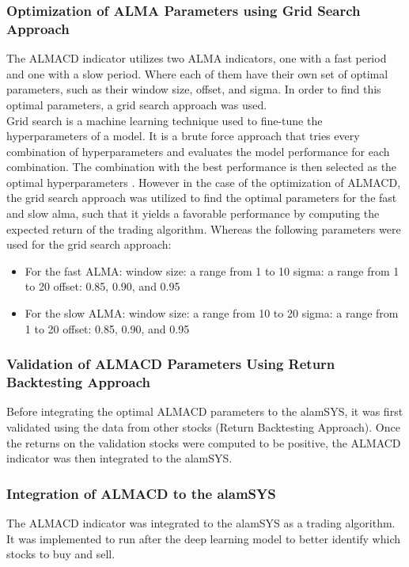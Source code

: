 \subsubsection{Optimization of ALMA Parameters using Grid Search Approach}
\label{subsubsec:almacd_gridsearch}
The ALMACD indicator utilizes two ALMA indicators, one with a fast
period and one with a slow period. Where each of them have their own
set of optimal parameters, such as their window size, offset, and sigma.
In order to find this optimal parameters, a grid search approach was
used.
\hfill \\
Grid search is a machine learning technique used to fine-tune the
hyperparameters of a model. It is a brute force approach that tries
every combination of hyperparameters and evaluates the model performance
for each combination. The combination with the best performance is
then selected as the optimal hyperparameters \cite{Joseph2018}.
However in the case of the optimization of ALMACD, the grid search
approach was utilized to find the optimal parameters for the 
fast and slow alma, such that it yields a favorable performance
by computing the expected return of the trading algorithm. Whereas
the following parameters were used for the grid search approach:
\begin{itemize}
    \item For the fast ALMA:
    \subitem window size: a range from 1 to 10
    \subitem sigma: a range from 1 to 20
    \subitem offset: 0.85, 0.90, and 0.95
    \item For the slow ALMA:
    \subitem window size: a range from 10 to 20
    \subitem sigma: a range from 1 to 20
    \subitem offset: 0.85, 0.90, and 0.95
\end{itemize}

\subsubsection{Validation of ALMACD Parameters Using Return Backtesting Approach}
\label{subsubsec:almacd_validation}
Before integrating the optimal ALMACD parameters to the alamSYS, it was
first validated using the data from other stocks (Return Backtesting Approach). Once the
returns on the validation stocks were computed to be positive,
the ALMACD indicator was then integrated to the alamSYS.


\subsubsection{Integration of ALMACD to the alamSYS}
\label{subsubsec:almacd_integration}
The ALMACD indicator was integrated to the alamSYS as a trading
algorithm. It was implemented to run after the deep learning model
to better identify which stocks to buy and sell.